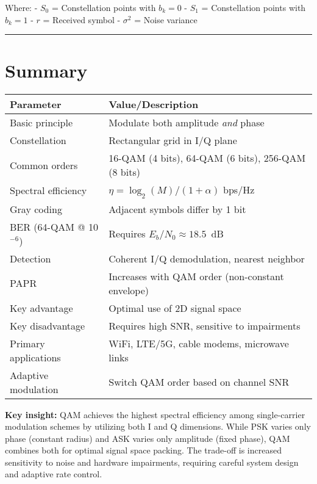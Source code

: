 Where: - \(S_0\) = Constellation points with \(b_k = 0\) - \(S_1\) =
Constellation points with \(b_k = 1\) - \(r\) = Received symbol -
\(\sigma^2\) = Noise variance

\begin{center}\rule{0.5\linewidth}{0.5pt}\end{center}

\section{Summary}

\begin{center}
\begin{tabular}{@{}ll@{}}
\toprule
\textbf{Parameter} & \textbf{Value/Description} \\
\midrule
Basic principle & Modulate both amplitude \emph{and} phase \\
Constellation & Rectangular grid in I/Q plane \\
Common orders & 16-QAM (4 bits), 64-QAM (6 bits), 256-QAM (8 bits) \\
Spectral efficiency & $\eta = \log_2(M)/(1+\alpha)$ bps/Hz \\
Gray coding & Adjacent symbols differ by 1 bit \\
BER (64-QAM @ 10$^{-6}$) & Requires $E_b/N_0 \approx 18.5$~dB \\
Detection & Coherent I/Q demodulation, nearest neighbor \\
PAPR & Increases with QAM order (non-constant envelope) \\
Key advantage & Optimal use of 2D signal space \\
Key disadvantage & Requires high SNR, sensitive to impairments \\
Primary applications & WiFi, LTE/5G, cable modems, microwave links \\
Adaptive modulation & Switch QAM order based on channel SNR \\
\bottomrule
\end{tabular}
\end{center}

\textbf{Key insight:} QAM achieves the highest spectral efficiency among single-carrier modulation schemes by utilizing both I and Q dimensions. While PSK varies only phase (constant radius) and ASK varies only amplitude (fixed phase), QAM combines both for optimal signal space packing. The trade-off is increased sensitivity to noise and hardware impairments, requiring careful system design and adaptive rate control.

